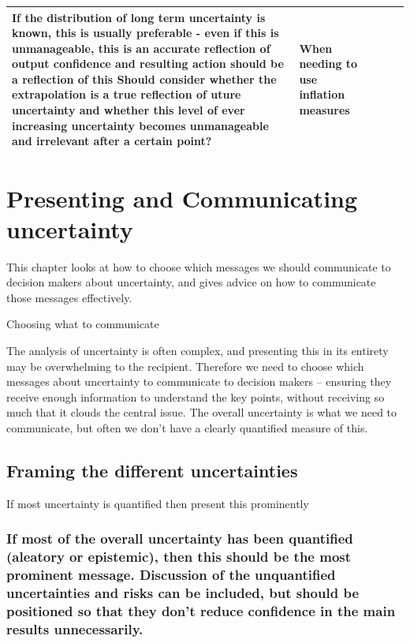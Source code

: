 \documentclass[]{book}
\begin{document}
\begin{longtable}[]{@{}lllll@{}}
\begin{minipage}[t]{0.16\columnwidth}
If the distribution of long term uncertainty is known, this is usually
preferable - even if this is unmanageable, this is an accurate
reflection of output confidence and resulting action should be a
reflection of this Should consider whether the extrapolation is a true
reflection of uture uncertainty and whether this level of ever
increasing uncertainty becomes unmanageable and irrelevant after a
certain point?\strut
\end{minipage} & \begin{minipage}[t]{0.13\columnwidth}\raggedright\strut
When needing to use inflation measures\strut
\end{minipage}\tabularnewline
\bottomrule
\end{longtable}

\chapter{Presenting and Communicating
uncertainty}\label{presenting-and-communicating-uncertainty}

 This chapter looks at how to choose which messages we should
communicate to decision makers about uncertainty, and gives advice on
how to communicate those messages effectively.

Choosing what to communicate

 The analysis of uncertainty is often complex, and presenting this in
its entirety may be overwhelming to the recipient. Therefore we need to
choose which messages about uncertainty to communicate to decision
makers -- ensuring they receive enough information to understand the key
points, without receiving so much that it clouds the central issue. The
overall uncertainty is what we need to communicate, but often we don't
have a clearly quantified measure of this.

\section{Framing the different
uncertainties}\label{framing-the-different-uncertainties}

 If most uncertainty is quantified then present this prominently

\subsection{If most of the overall uncertainty has been quantified
(aleatory or epistemic), then this should be the most prominent message.
Discussion of the unquantified uncertainties and risks can be included,
but should be positioned so that they don't reduce confidence in the
main results
unnecessarily.}\label{if-most-of-the-overall-uncertainty-has-been-quantified-aleatory-or-epistemic-then-this-should-be-the-most-prominent-message.-discussion-of-the-unquantified-uncertainties-and-risks-can-be-included-but-should-be-positioned-so-that-they-dont-reduce-confidence-in-the-main-results-unnecessarily.}
\end{document}
